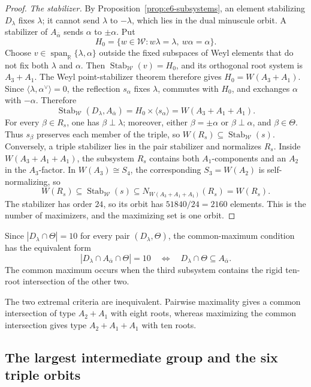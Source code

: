 \documentclass[11pt]{article}
\theoremstyle{remark}
\begin{document}
\begin{proof}
\emph{The stabilizer.} By Proposition~\ref{prop:e6-subsystems}, an element stabilizing
\(D_\lambda\) fixes \(\lambda\); it cannot send \(\lambda\) to
\(-\lambda\), which lies in the dual minuscule orbit. A stabilizer of
\(A_{\bar\alpha}\) sends \(\alpha\) to \(\pm\alpha\). Put
\[
 H_0=\{w\in\mathcal W:w\lambda=\lambda,\ w\alpha=\alpha\}.
\]
Choose \(v\in\operatorname{span}_{\mathbb R}\{\lambda,\alpha\}\)
outside the fixed subspaces of Weyl elements that do not fix both
\(\lambda\) and \(\alpha\). Then
\(\operatorname{Stab}_{\mathcal W}(v)=H_0\), and its orthogonal root
system is \(A_3+A_1\). The Weyl point-stabilizer theorem therefore gives
\(H_0=W(A_3+A_1)\). Since
\(\langle\lambda,\alpha^\vee\rangle=0\), the reflection \(s_\alpha\)
fixes \(\lambda\), commutes with \(H_0\), and exchanges \(\alpha\)
with \(-\alpha\). Therefore
\[
 \operatorname{Stab}_{\mathcal W}(D_\lambda,A_{\bar\alpha})
 =H_0\times\langle s_\alpha\rangle
 =W(A_3+A_1+A_1).
\]
For every \(\beta\in R_s\), one has \(\beta\perp\lambda\); moreover,
either \(\beta=\pm\alpha\) or \(\beta\perp\alpha\), and
\(\beta\in\Theta\). Thus \(s_\beta\) preserves each member of the
triple, so \(W(R_s)\subseteq\operatorname{Stab}_{\mathcal W}(s)\).
Conversely, a triple stabilizer lies in the pair stabilizer and normalizes
\(R_s\).
Inside \(W(A_3+A_1+A_1)\), the subsystem \(R_s\) contains both
\(A_1\)-components and an \(A_2\) in the \(A_3\)-factor. In
\(W(A_3)\cong S_4\), the corresponding \(S_3=W(A_2)\) is
self-normalizing, so
\[
 W(R_s)\subseteq\operatorname{Stab}_{\mathcal W}(s)
 \subseteq N_{W(A_3+A_1+A_1)}(R_s)=W(R_s).
\]
The stabilizer has order \(24\), so its orbit has
\(51840/24=2160\) elements. This is the number of maximizers, and the
maximizing set is one orbit.
\end{proof}

Since \(|D_\lambda\cap\Theta|=10\) for every pair
\((D_\lambda,\Theta)\), the common-maximum condition has the equivalent
form
\[
 |D_\lambda\cap A_{\bar\alpha}\cap\Theta|=10
 \quad\Longleftrightarrow\quad
 D_\lambda\cap\Theta\subseteq A_{\bar\alpha}.
\]
The common maximum occurs when the third subsystem contains the rigid
ten-root intersection of the other two.

The two extremal criteria are inequivalent. Pairwise maximality gives a
common intersection of type \(A_2+A_1\) with eight roots, whereas maximizing
the common intersection gives type \(A_2+A_1+A_1\) with ten roots.

\subsection{The largest intermediate group and the six triple orbits}
\end{document}
